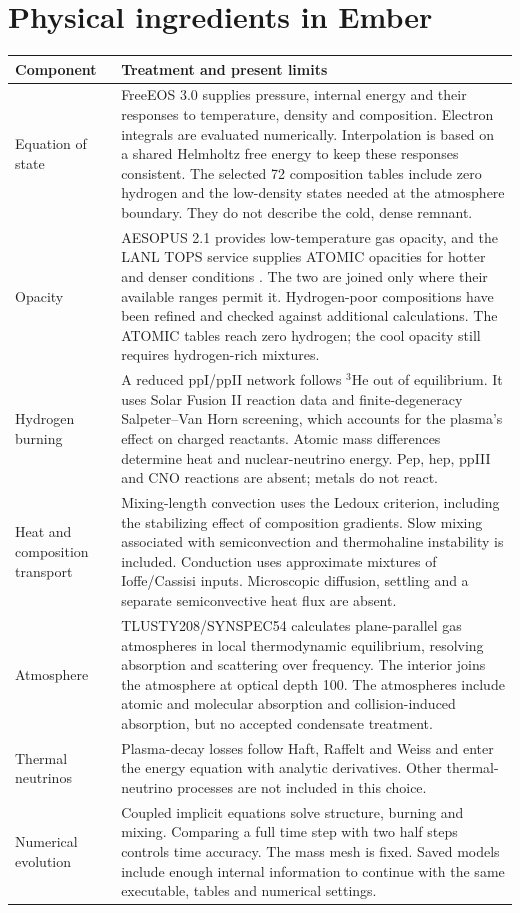 \documentclass[11pt,letterpaper]{article}
\begin{document}
\section{Physical ingredients in Ember}
\begin{longtable}{@{}>{\raggedright\arraybackslash}p{}>{\raggedright\arraybackslash}p{}@{}}
\toprule Component & Treatment and present limits \\\midrule\endhead
Equation of state & FreeEOS 3.0 supplies pressure, internal energy and their
responses to temperature, density and composition. Electron integrals are
evaluated numerically. Interpolation is based on a shared Helmholtz free energy
to keep these responses consistent. The selected
72 composition tables include zero hydrogen and the low-density states
needed at the atmosphere boundary. They do not describe the cold, dense remnant. \\[5pt]
Opacity & AESOPUS 2.1 provides low-temperature gas opacity, and the LANL TOPS
service supplies ATOMIC opacities for hotter and denser conditions
\cite{colgan16,tops}. The two are joined only where their
available ranges permit it. Hydrogen-poor compositions have been refined and
checked against additional calculations. The ATOMIC tables reach
zero hydrogen; the cool opacity still requires hydrogen-rich mixtures. \\[5pt]
Hydrogen burning & A reduced ppI/ppII network follows $^3$He out of equilibrium.
It uses Solar Fusion II reaction data and finite-degeneracy
Salpeter--Van Horn screening, which accounts for the plasma's effect on charged
reactants. Atomic mass differences determine heat and nuclear-neutrino energy.
Pep, hep, ppIII and CNO reactions are absent; metals do not react. \\[5pt]
Heat and composition transport & Mixing-length convection uses the Ledoux
criterion, including the stabilizing effect of composition gradients. Slow
mixing associated with semiconvection and thermohaline instability is included.
Conduction uses approximate mixtures of Ioffe/Cassisi inputs. Microscopic
diffusion, settling and a separate semiconvective heat flux are absent. \\[5pt]
Atmosphere & TLUSTY208/SYNSPEC54 calculates plane-parallel gas atmospheres in
local thermodynamic equilibrium, resolving absorption and scattering over
frequency. The interior joins the atmosphere at optical depth 100. The
atmospheres include atomic and molecular absorption and collision-induced
absorption, but no accepted condensate treatment. \\[5pt]
Thermal neutrinos & Plasma-decay losses follow Haft, Raffelt and Weiss
\cite{hrw94} and enter the energy equation with analytic derivatives. Other
thermal-neutrino processes are not included in this choice. \\[5pt]
Numerical evolution & Coupled implicit equations solve structure, burning and
mixing. Comparing a full time step with two half steps controls time accuracy.
The mass mesh is fixed. Saved models include enough internal information to
continue with the same executable, tables and numerical settings. \\
\bottomrule\end{longtable}
\end{document}
